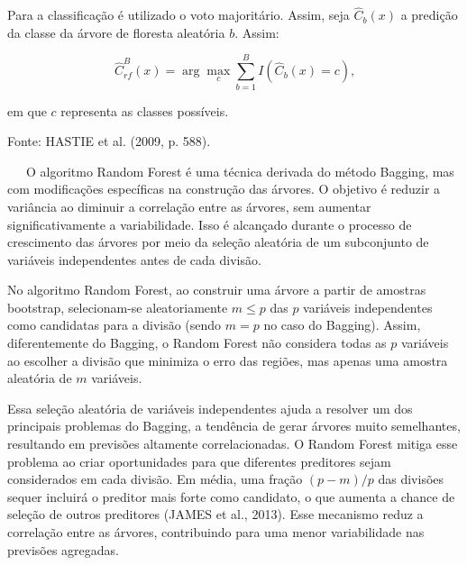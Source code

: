 \documentclass[
  12pt,
  a4paper,
]{scrreprt}
\begin{document}
\begin{algo}
{\begin{algorithm}[H]
\begin{algorithmic}
\vspace{1em}

\State \hspace{0.7em} Para a classificação é utilizado o voto majoritário. Assim, seja $\hat{C}_{b}\left(x\right)$ a predição da classe da árvore de floresta aleatória $b$. Assim:

$$
\hat{C}^{B}_{rf}\left(x\right) = \arg \max_c \sum^{B}_{b = 1}I\left(\hat{C}_b\left(x\right) = c\right)\text{,}
$$

\State em que $c$ representa as classes possíveis.

\end{algorithmic}
\end{algorithm}

}

\caption{\label{algo-rf}Fonte: HASTIE et al. (2009, p. 588).}

\end{algo}%

~~~O algoritmo Random Forest é uma técnica derivada do método Bagging,
mas com modificações específicas na construção das árvores. O objetivo é
reduzir a variância ao diminuir a correlação entre as árvores, sem
aumentar significativamente a variabilidade. Isso é alcançado durante o
processo de crescimento das árvores por meio da seleção aleatória de um
subconjunto de variáveis independentes antes de cada divisão.

\vspace{12pt}

No algoritmo Random Forest, ao construir uma árvore a partir de amostras
bootstrap, selecionam-se aleatoriamente \(m \leq p\) das \(p\) variáveis
independentes como candidatas para a divisão (sendo \(m = p\) no caso do
Bagging). Assim, diferentemente do Bagging, o Random Forest não
considera todas as \(p\) variáveis ao escolher a divisão que minimiza o
erro das regiões, mas apenas uma amostra aleatória de \(m\) variáveis.

\vspace{12pt}

Essa seleção aleatória de variáveis independentes ajuda a resolver um
dos principais problemas do Bagging, a tendência de gerar árvores muito
semelhantes, resultando em previsões altamente correlacionadas. O Random
Forest mitiga esse problema ao criar oportunidades para que diferentes
preditores sejam considerados em cada divisão. Em média, uma fração
\((p - m)/p\) das divisões sequer incluirá o preditor mais forte como
candidato, o que aumenta a chance de seleção de outros preditores (JAMES
et al., 2013). Esse mecanismo reduz a correlação entre as árvores,
contribuindo para uma menor variabilidade nas previsões agregadas.
\end{document}
